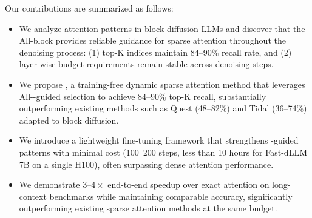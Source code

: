 Our contributions are summarized as follows:
\begin{itemize}
    \item We analyze attention patterns in block diffusion LLMs and discover that the All-\mask block provides reliable guidance for sparse attention throughout the denoising process: (1) top-K indices maintain 84--90\% recall rate, and (2) layer-wise budget requirements remain stable across denoising steps.
    \item We propose \name, a training-free dynamic sparse attention method that leverages All-\mask-guided selection to achieve 84--90\% top-K recall, substantially outperforming existing methods such as Quest (48--82\%) and Tidal (36--74\%) adapted to block diffusion.
    \item We introduce a lightweight fine-tuning framework that 
    strengthens \mask-guided patterns with minimal cost (100~200 steps, 
    less than 10 hours for Fast-dLLM 7B on a single H100), often surpassing 
    dense attention performance.
    \item We demonstrate $3$--$4\times$ end-to-end speedup over exact attention on long-context benchmarks while maintaining comparable accuracy, significantly outperforming existing sparse attention methods at the same budget.
\end{itemize}